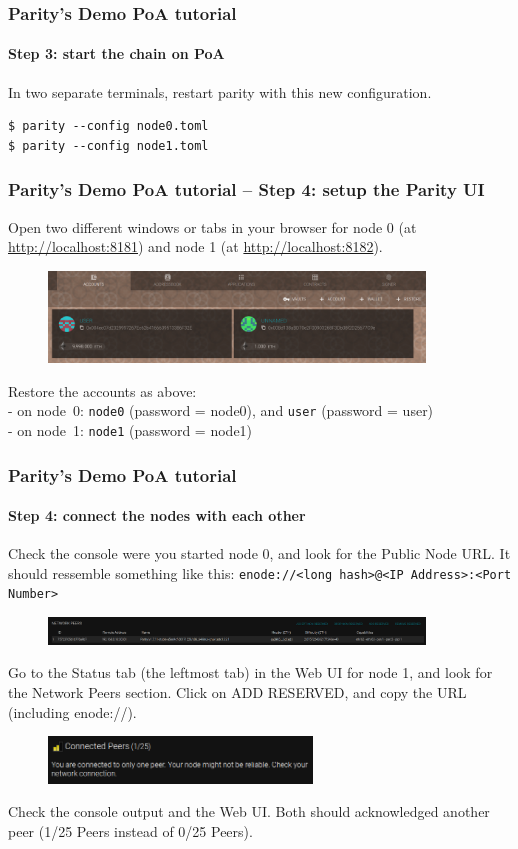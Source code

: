 \begin{frame}[fragile]
	\frametitle{Parity's Demo PoA tutorial}
	\framesubtitle{Step 3: start the chain on PoA}
	In two separate terminals, restart parity with this new configuration.
	\begin{Verbatim}[fontsize=\tiny]
$ parity --config node0.toml
$ parity --config node1.toml
	\end{Verbatim}
\end{frame}

\begin{frame}[fragile]
	\frametitle{Parity's Demo PoA tutorial -- Step 4: setup the Parity UI}
	Open two different windows or tabs in your browser for node 0 (at \url{http://localhost:8181}) and node 1 (at \url{http://localhost:8182}).
	\begin{figure}
		\includegraphics[width=10cm]{../pics/ethereum/parity-poa-tutorial/node0-two-accounts}
	\end{figure}
	Restore the accounts as above:\\
	- on node~0: \texttt{node0} (password = node0), and \texttt{user} (password = user)\\
	- on node~1: \texttt{node1} (password = node1)
\end{frame}

\begin{frame}[fragile]
	\frametitle{Parity's Demo PoA tutorial}
	\framesubtitle{Step 4: connect the nodes with each other}
	Check the console were you started node 0, and look for the Public Node URL. It should ressemble something like this: \texttt{enode://<long hash>@<IP Address>:<Port Number>}
	\begin{figure}
		\includegraphics[width=10cm]{../pics/ethereum/parity-poa-tutorial/parity-poa-network-peers}
	\end{figure}
	Go to the Status tab (the leftmost tab) in the Web UI for node 1, and look for the Network Peers section. Click on ADD RESERVED, and copy the URL (including enode://).
	\begin{figure}
		\includegraphics[width=7cm]{../pics/ethereum/parity-poa-tutorial/parity-poa-connected-peers}
	\end{figure}
	Check the console output and the Web UI. Both should acknowledged another peer (1/25 Peers instead of 0/25 Peers).
\end{frame}


